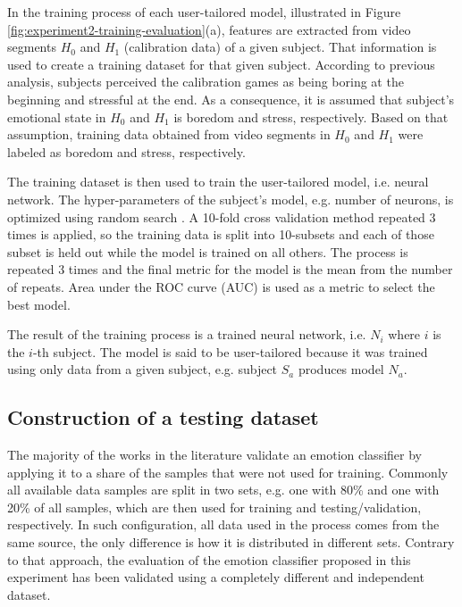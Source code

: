 In the training process of each user-tailored model, illustrated in Figure \ref{fig:experiment2-training-evaluation}(a), features are extracted from video segments $H_0$ and $H_1$ (calibration data) of a given subject. That information is used to create a training dataset for that given subject. According to previous analysis, subjects perceived the calibration games as being boring at the beginning and stressful at the end. As a consequence, it is assumed that subject's emotional state in $H_0$ and $H_1$ is boredom and stress, respectively. Based on that assumption, training data obtained from video segments in $H_0$ and $H_1$ were labeled as boredom and stress, respectively.

The training dataset is then used to train the user-tailored model, i.e. neural network. The hyper-parameters of the subject's model, e.g. number of neurons, is optimized using random search \parencite{bergstra2012random}. A 10-fold cross validation method repeated 3 times is applied, so the training data is split into 10-subsets and each of those subset is held out while the model is trained on all others. The process is repeated 3 times and the final metric for the model is the mean from the number of repeats. Area under the ROC curve (AUC) is used as a metric to select the best model.

The result of the training process is a trained neural network, i.e. $N_i$ where $i$ is the $i$-th subject. The model is said to be user-tailored because it was trained using only data from a given subject, e.g. subject $S_a$ produces model $N_a$.

\subsection{Construction of a testing dataset}
\label{sec:experiment2-construction-validation}

The majority of the works in the literature validate an emotion classifier by applying it to a share of the samples that were not used for training. Commonly all available data samples are split in two sets, e.g. one with 80\% and one with 20\% of all samples, which are then used for training and testing/validation, respectively. In such configuration, all data used in the process comes from the same source, the only difference is how it is distributed in different sets. Contrary to that approach, the evaluation of the emotion classifier proposed in this experiment has been validated using a completely different and independent dataset.

